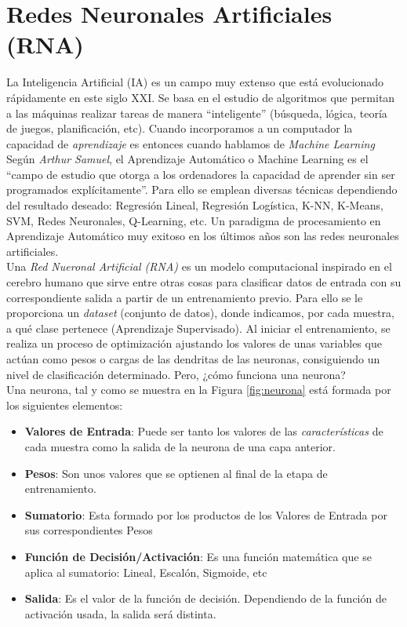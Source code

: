 \section{Redes Neuronales Artificiales (RNA)}
\label{sec:redes_neuronales}
La Inteligencia Artificial (IA) es un campo muy extenso que está evolucionado rápidamente en este siglo XXI. Se basa en el estudio de algoritmos que permitan a las máquinas realizar tareas de manera ``inteligente'' (búsqueda, lógica, teoría de juegos, planificación, etc). Cuando incorporamos a un computador la capacidad de \textit{aprendizaje} es entonces cuando hablamos de \textit{Machine Learning}\\

Según \emph{Arthur Samuel}, el Aprendizaje Automático o Machine Learning es el ``campo de estudio que otorga a los ordenadores la capacidad de aprender sin ser programados explícitamente''. Para ello se emplean diversas técnicas dependiendo del resultado deseado: Regresión Lineal, Regresión Logística, K-NN, K-Means, SVM, Redes Neuronales, Q-Learning, etc. Un paradigma de procesamiento en Aprendizaje Automático muy exitoso en los últimos años son las redes neuronales artificiales.\\

Una \textit{Red Nueronal Artificial (RNA)} es un modelo computacional inspirado en el cerebro humano que sirve entre otras cosas para clasificar datos de entrada con su correspondiente salida a partir de un entrenamiento previo. Para ello se le proporciona un \textit{dataset} (conjunto de datos), donde indicamos, por cada muestra, a qué clase pertenece (Aprendizaje Supervisado). Al iniciar el entrenamiento, se realiza un proceso de optimización ajustando los valores de unas variables que actúan como pesos o cargas de las dendritas de las neuronas, consiguiendo un nivel de clasificación determinado. Pero, ¿cómo funciona una neurona?\\

Una neurona, tal y como se muestra en la Figura \ref{fig:neurona} está formada por los siguientes elementos:
\begin{itemize}
	\item \textbf{Valores de Entrada}: Puede ser tanto los valores de las \textit{características} de cada muestra como la salida de la neurona de una capa anterior.
	\item \textbf{Pesos}: Son unos valores que se optienen al final de la etapa de entrenamiento.
	\item \textbf{Sumatorio}: Esta formado por los productos de los Valores de Entrada por sus correspondientes Pesos
	\item \textbf{Función de Decisión/Activación}: Es una función matemática que se aplica al sumatorio: Lineal, Escalón, Sigmoide, etc
	\item \textbf{Salida}: Es el valor de la función de decisión. Dependiendo de la función de activación usada, la salida será distinta.
\end{itemize}

